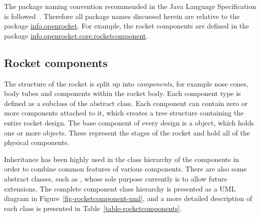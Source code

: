 The package naming convention recommended in the Java Language
Specification is followed~\cite{java-packages}.  Therefore all package
names discussed herein are relative to the package
\url{info.openrocket}.  For example, the rocket components are
defined in the package \url{info.openrocket.core.rocketcomponent}.




\subsection{Rocket components}
\label{sec-rocket-components}

The structure of the rocket is split up into {\it components}, for
example nose cones, body tubes and components within the rocket body.
Each component type is defined as a subclass of the abstract
 class.  Each component can contain zero or more
components attached to it, which creates a tree structure containing
the entire rocket design.  The base component of every design is a
 object, which holds one or more  objects.
These represent the stages of the rocket and hold all of the physical
components.

Inheritance has been highly used in the class hierarchy of the
components in order to combine common features of various components.
There are also some abstract classes, such as ,
whose sole purpose currently is to allow future extensions.  The
complete component class hierarchy is presented as a UML diagram in
Figure~\ref{fig-rocketcomponent-uml}, and a more detailed description
of each class is presented in Table~\ref{table-rocketcomponents}.

\begin{sidewaysfigure}
\centering
\hspace{-1cm}
\caption{A UML diagram of the rocket component classes.  Abstract
  classes are shown in italics.}
\label{fig-rocketcomponent-uml}
\end{sidewaysfigure}


